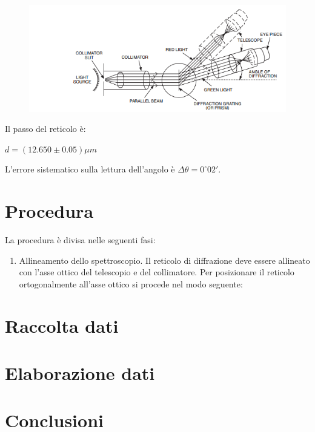 \documentclass{article}
\begin{document}
\begin{figure}[!ht]
\center
\includegraphics[scale=0.8]{spettroscopio2}
\end{figure}

Il passo del reticolo è: 
\begin{center}
$d = (12.650 \pm 0.05)\mu m$
\end{center}

L'errore sistematico sulla lettura dell'angolo è $\Delta\theta = 0^{\circ} 02'$. \\


\newpage
\section{Procedura}
La procedura è divisa nelle seguenti fasi: \\

\begin{enumerate}
\item Allineamento dello spettroscopio. Il reticolo di diffrazione deve essere allineato con l'asse ottico del telescopio e del collimatore. Per posizionare il reticolo ortogonalmente all'asse ottico si procede nel modo seguente:

\end{enumerate}

\newpage
\section{Raccolta dati}
 

\newpage
\section{Elaborazione dati}
 

\newpage
\section{Conclusioni}
\end{document}
